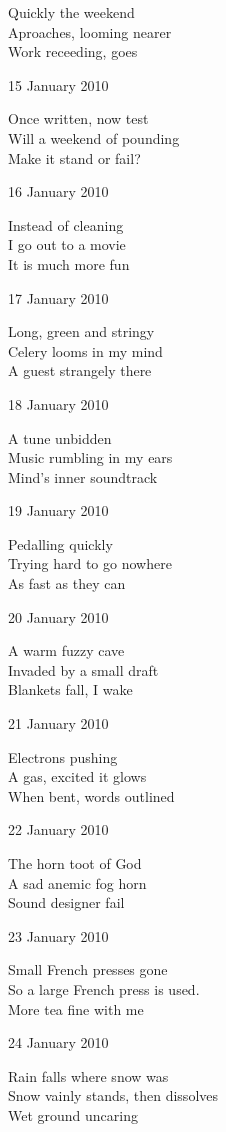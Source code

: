 \documentclass[12pt]{article}
\begin{document}
Quickly the weekend \\
Aproaches, looming nearer \\
Work receeding, goes

15 January 2010

Once written, now test \\
Will a weekend of pounding \\
Make it stand or fail?

16 January 2010

Instead of cleaning \\
I go out to a movie \\
It is much more fun

17 January 2010

Long, green and stringy \\
Celery looms in my mind \\
A guest strangely there

\newpage

18 January 2010

A tune unbidden \\
Music rumbling in my ears \\
Mind's inner soundtrack

19 January 2010

Pedalling quickly \\
Trying hard to go nowhere \\
As fast as they can

20 January 2010

A warm fuzzy cave \\
Invaded by a small draft \\
Blankets fall, I wake

21 January 2010

Electrons pushing \\
A gas, excited it glows \\
When bent, words outlined

22 January 2010

The horn toot of God \\
A sad anemic fog horn \\
Sound designer fail

23 January 2010

Small French presses gone \\
So a large French press is used. \\
More tea fine with me 

24 January 2010

Rain falls where snow was \\
Snow vainly stands, then dissolves \\
Wet ground uncaring
\end{document}
